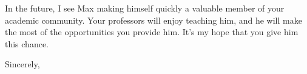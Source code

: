 \documentclass[11pt, letterpaper]{letter} %
\begin{document}
\begin{letter}
In the future, I see Max making himself quickly a valuable member of your academic community. 
Your professors will enjoy teaching him, and he will make the most of the opportunities you provide him. 
It's my hope that you give him this chance.

\closing{Sincerely,}




\end{letter}
\end{document}
